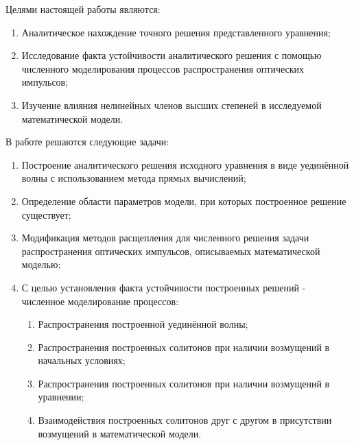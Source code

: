 \documentclass[14pt,a4paper]{extreport}
\begin{document}
			Целями настоящей работы являются:
			\begin{enumerate}
				\item Аналитическое нахождение точного решения представленного уравнения;
				\item Исследование факта устойчивости аналитического решения с помощью численного моделирования процессов распространения оптических импульсов;
				\item Изучение влияния нелинейных членов высших степеней в исследуемой математической модели.
			\end{enumerate}
			В работе решаются следующие задачи: 
			\begin{enumerate}
				\item Построение аналитического решения исходного уравнения в виде уединённой волны с использованием метода прямых вычислений; 
				\item Определение области параметров модели, при которых построенное решение существует;
				\item Модификация методов расщепления для численного решения задачи распространения оптических импульсов, описываемых математической моделью; 
				\item С целью установления факта устойчивости построенных решений - численное моделирование процессов:
				\begin{enumerate}
					\item Распространения построенной уединённой волны; 
					\item Распространения построенных солитонов при наличии возмущений в начальных условиях;  
					\item Распространения построенных солитонов при наличии возмущений в уравнении;
					\item Взаимодействия построенных солитонов друг с другом в присутствии возмущений в математической модели.
				\end{enumerate}
			\end{enumerate}
\end{document}
